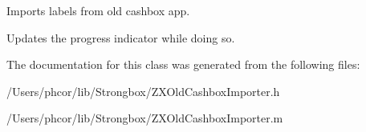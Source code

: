 Imports labels from old cashbox app. 

Updates the progress indicator while doing so. 

The documentation for this class was generated from the following files:\begin{CompactItemize}
\item 
/Users/phcor/lib/Strongbox/ZXOldCashboxImporter.h\item 
/Users/phcor/lib/Strongbox/ZXOldCashboxImporter.m\end{CompactItemize}
